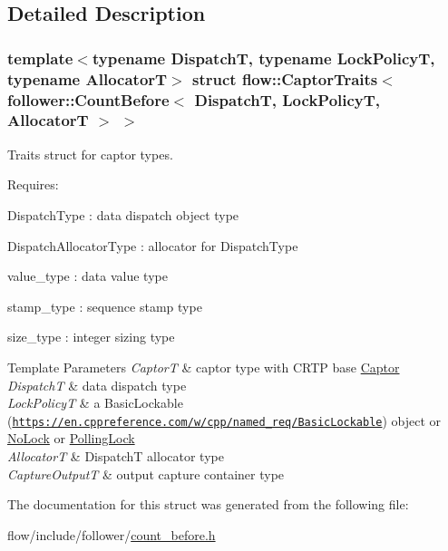 \subsection{Detailed Description}
\subsubsection*{template$<$typename DispatchT, typename Lock\+PolicyT, typename AllocatorT$>$\newline
struct flow\+::\+Captor\+Traits$<$ follower\+::\+Count\+Before$<$ Dispatch\+T, Lock\+Policy\+T, Allocator\+T $>$ $>$}

Traits struct for captor types. 

Requires\+:
\begin{DoxyItemize}
\item {\ttfamily Dispatch\+Type} \+: data dispatch object type
\item {\ttfamily Dispatch\+Allocator\+Type} \+: allocator for {\ttfamily Dispatch\+Type}
\item {\ttfamily value\+\_\+type} \+: data value type
\item {\ttfamily stamp\+\_\+type} \+: sequence stamp type
\item {\ttfamily size\+\_\+type} \+: integer sizing type
\end{DoxyItemize}


\begin{DoxyTemplParams}{Template Parameters}
{\em CaptorT} & captor type with C\+R\+TP base {\ttfamily \hyperlink{classflow_1_1_captor}{Captor}}\\
\hline
{\em DispatchT} & data dispatch type \\
\hline
{\em Lock\+PolicyT} & a Basic\+Lockable (\href{https://en.cppreference.com/w/cpp/named_req/BasicLockable}{\tt https\+://en.\+cppreference.\+com/w/cpp/named\+\_\+req/\+Basic\+Lockable}) object or \hyperlink{structflow_1_1_no_lock}{No\+Lock} or \hyperlink{structflow_1_1_polling_lock}{Polling\+Lock} \\
\hline
{\em AllocatorT} & {\ttfamily DispatchT} allocator type \\
\hline
{\em Capture\+OutputT} & output capture container type \\
\hline
\end{DoxyTemplParams}


The documentation for this struct was generated from the following file\+:\begin{DoxyCompactItemize}
\item 
flow/include/follower/\hyperlink{count__before_8h}{count\+\_\+before.\+h}\end{DoxyCompactItemize}
